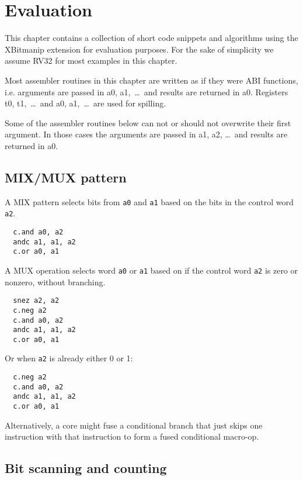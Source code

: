 \chapter{Evaluation}

This chapter contains a collection of short code snippets and algorithms using
the XBitmanip extension for evaluation purposes. For the sake of simplicity we
assume RV32 for most examples in this chapter.

Most assembler routines in this chapter are written as if they were ABI functions,
i.e. arguments are passed in a0, a1,~\dots~and results are returned in a0. Registers
t0, t1,~\dots~and a0, a1,~\dots~are used for spilling.

Some of the assembler routines below can not or should not overwrite their
first argument. In those cases the arguments are passed in a1, a2, \dots\ and
results are returned in a0.

\section{MIX/MUX pattern}

A MIX pattern selects bits from {\tt a0} and {\tt a1} based on the bits in
the control word {\tt a2}.

\begin{verbatim}
  c.and a0, a2
  andc a1, a1, a2
  c.or a0, a1
\end{verbatim}

A MUX operation selects word {\tt a0} or {\tt a1} based on if the control
word {\tt a2} is zero or nonzero, without branching.

\begin{verbatim}
  snez a2, a2
  c.neg a2
  c.and a0, a2
  andc a1, a1, a2
  c.or a0, a1
\end{verbatim}

Or when {\tt a2} is already either 0 or 1:

\begin{verbatim}
  c.neg a2
  c.and a0, a2
  andc a1, a1, a2
  c.or a0, a1
\end{verbatim}

Alternatively, a core might fuse a conditional branch that just skips one
instruction with that instruction to form a fused conditional macro-op.

\section{Bit scanning and counting}

